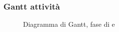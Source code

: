 \subsubsection{Gantt attività}
\begin{figure}[H]
	\centering
	\caption{Diagramma di Gantt, fase di \PD{} e \Cod{}}
\end{figure}

